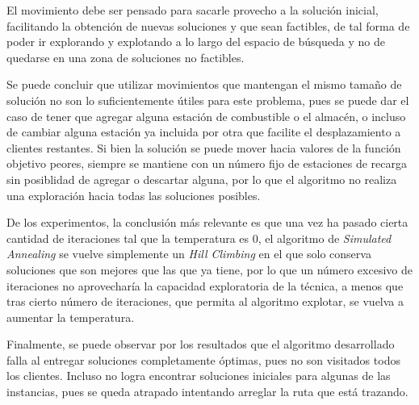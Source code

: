 \documentclass[letter, 10pt]{article}
\begin{document}
El movimiento debe ser pensado para sacarle provecho a la solución inicial, facilitando la obtención de nuevas soluciones y que sean factibles, de tal forma de poder ir explorando y explotando a lo largo del espacio de búsqueda y no de quedarse en una zona de soluciones no factibles.

Se puede concluir que utilizar movimientos que mantengan el mismo tamaño de solución no son lo suficientemente útiles para este problema, pues se puede dar el caso de tener que agregar alguna estación de combustible o el almacén, o incluso de cambiar alguna estación ya incluida por otra que facilite el desplazamiento a clientes restantes. Si bien la solución se puede mover hacia valores de la función objetivo peores, siempre se mantiene con un número fijo de estaciones de recarga sin posiblidad de agregar o descartar alguna, por lo que el algoritmo no realiza una exploración hacia todas las soluciones posibles.

De los experimentos, la conclusión más relevante es que una vez ha pasado cierta cantidad de iteraciones tal que la temperatura es $0$, el algoritmo de \textit{Simulated Annealing} se vuelve simplemente un \textit{Hill Climbing} en el que solo conserva soluciones que son mejores que las que ya tiene, por lo que un número excesivo de iteraciones no aprovecharía la capacidad exploratoria de la técnica, a menos que tras cierto número de iteraciones, que permita al algoritmo explotar, se vuelva a aumentar la temperatura.

Finalmente, se puede observar por los resultados que el algoritmo desarrollado falla al entregar soluciones completamente óptimas, pues no son visitados todos los clientes. Incluso no logra encontrar soluciones iniciales para algunas de las instancias, pues se queda atrapado intentando arreglar la ruta que está trazando.



\end{document}
